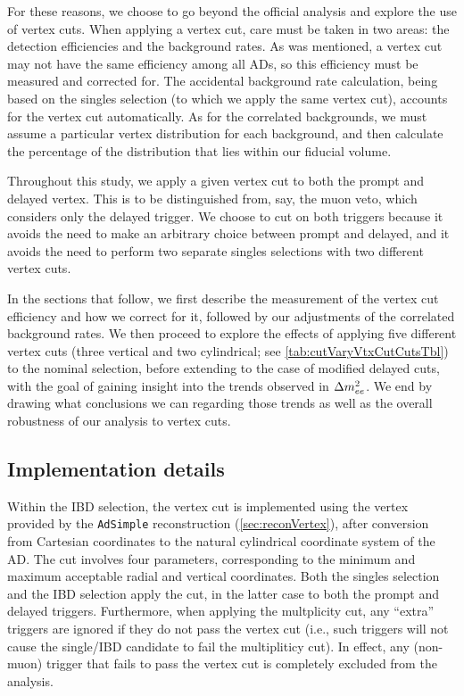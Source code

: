 \documentclass[../thesis.tex]{subfiles}
\begin{document}
For these reasons, we choose to go beyond the official analysis and explore the use of vertex cuts. When applying a vertex cut, care must be taken in two areas: the detection efficiencies and the background rates. As was mentioned, a vertex cut may not have the same efficiency among all ADs, so this efficiency must be measured and corrected for. The accidental background rate calculation, being based on the singles selection (to which we apply the same vertex cut), accounts for the vertex cut automatically. As for the correlated backgrounds, we must assume a particular vertex distribution for each background, and then calculate the percentage of the distribution that lies within our fiducial volume.

Throughout this study, we apply a given vertex cut to both the prompt and delayed vertex. This is to be distinguished from, say, the muon veto, which considers only the delayed trigger. We choose to cut on both triggers because it avoids the need to make an arbitrary choice between prompt and delayed, and it avoids the need to perform two separate singles selections with two different vertex cuts.

In the sections that follow, we first describe the measurement of the vertex cut efficiency and how we correct for it, followed by our adjustments of the correlated background rates. We then proceed to explore the effects of applying five different vertex cuts (three vertical and two cylindrical; see \autoref{tab:cutVaryVtxCutCutsTbl}) to the nominal selection, before extending to the case of modified delayed cuts, with the goal of gaining insight into the trends observed in $\Delta m^2_{ee}$. We end by drawing what conclusions we can regarding those trends as well as the overall robustness of our analysis to vertex cuts.

\subsection{Implementation details}
\label{sec:cutVaryVtxCutImplDet}

Within the IBD selection, the vertex cut is implemented using the vertex provided by the \texttt{AdSimple} reconstruction (\autoref{sec:reconVertex}), after conversion from Cartesian coordinates to the natural cylindrical coordinate system of the AD. The cut involves four parameters, corresponding to the minimum and maximum acceptable radial and vertical coordinates. Both the singles selection and the IBD selection apply the cut, in the latter case to both the prompt and delayed triggers. Furthermore, when applying the multplicity cut, any ``extra'' triggers are ignored if they do not pass the vertex cut (i.e., such triggers will not cause the single/IBD candidate to fail the multipliticy cut). In effect, any (non-muon) trigger that fails to pass the vertex cut is completely excluded from the analysis.
\end{document}
